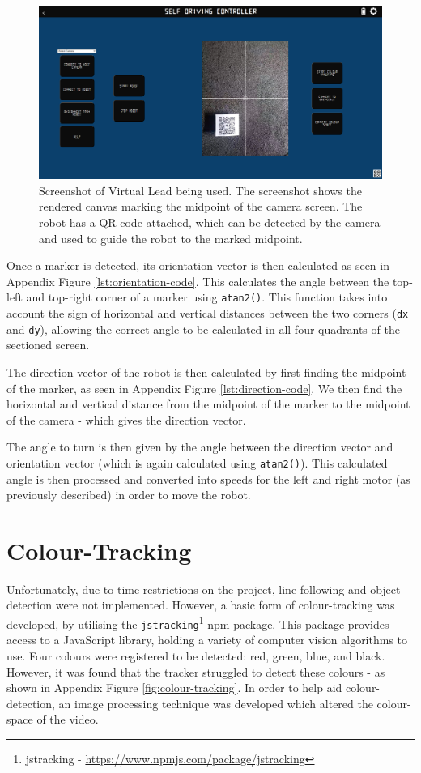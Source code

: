 \documentclass{l4proj}
\begin{document}
\begin{figure}
    \centering
    \includegraphics[width=1\textwidth]{images/virtual-lead-screenshot.pdf}
    \caption{Screenshot of Virtual Lead being used. The screenshot shows the rendered canvas marking the midpoint of the camera screen. The robot has a QR code attached, which can be detected by the camera and used to guide the robot to the marked midpoint.}
    \label{fig:virtual-lead-camera}
\end{figure}

Once a marker is detected, its orientation vector is then calculated as seen in Appendix Figure \ref{lst:orientation-code}. This calculates the angle between the top-left and top-right corner of a marker using \lstinline{atan2()}. This function takes into account the sign of horizontal and vertical distances between the two corners (\lstinline{dx} and \lstinline{dy}), allowing the correct angle to be calculated in all four quadrants of the sectioned screen.

The direction vector of the robot is then calculated by first finding the midpoint of the marker, as seen in Appendix Figure \ref{lst:direction-code}. We then find the horizontal and vertical distance from the midpoint of the marker to the midpoint of the camera - which gives the direction vector. 

The angle to turn is then given by the angle between the direction vector and orientation vector (which is again calculated using \lstinline{atan2()}). This calculated angle is then processed and converted into speeds for the left and right motor (as previously described) in order to move the robot.


\section{Colour-Tracking}
Unfortunately, due to time restrictions on the project, line-following and object-detection were not implemented. However, a basic form of colour-tracking was developed, by utilising the \lstinline{jstracking}\footnote{jstracking - \url{https://www.npmjs.com/package/jstracking}} npm package. This package provides access to a JavaScript library, holding a variety of computer vision algorithms to use. Four colours were registered to be detected: red, green, blue, and black. However, it was found that the tracker struggled to detect these colours - as shown in Appendix Figure \ref{fig:colour-tracking}. In order to help aid colour-detection, an image processing technique was developed which altered the colour-space of the video.
\end{document}
